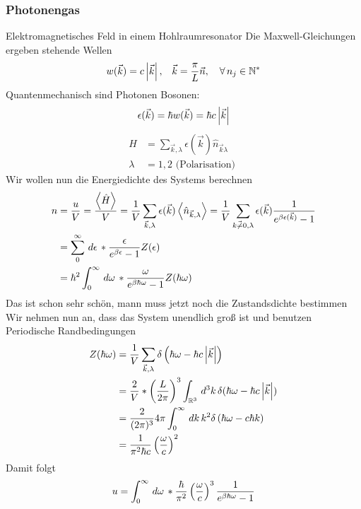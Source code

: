 \subsubsection*{Photonengas}
Elektromagnetisches Feld in einem Hohlraumresonator
Die Maxwell-Gleichungen ergeben stehende Wellen
%
\begin{align*}
  w(\vec{k}) = c \left| \vec{k} \right|, && \vec{k} = \frac{\pi}{L} \vec{n}, \quad\forall\, n_j \in \mathbb{N}^{\ast}
\end{align*}
%
Quantenmechanisch sind Photonen Bosonen:
%
\begin{align*}
  \epsilon(\vec{k}) = \hbar w (\vec{k}) = \hbar c  \left| \vec{k} \right| 
\end{align*}
%
%
\begin{align*}
  H & = \sum_{\vec{k}, \lambda}^{} \epsilon(\vec{k}) \hat{n}_{\vec{k} \lambda} \\
  \lambda & = 1,2 \text{ (Polarisation) }
\end{align*}
%
Wir wollen nun die Energiedichte des Systems berechnen
%
\begin{align*}
  n & = \frac{u}{V}= \frac{\Braket{\hat{H}}}{V} = \frac{1}{V} \sum_{\vec{k}, \lambda}^{} \epsilon(\vec{k})
  \Braket{ \hat{n}_{\vec{k},\lambda} } = \frac{1}{V} \sum_{\vec{k \neq 0 },\lambda}^{} \epsilon(\vec{k}) 
  \frac{1}{e^{\beta \epsilon(\vec{k})} - 1} \\
  & = \sum_{0}^{\infty} \,d\epsilon\, * \frac{\epsilon}{e^{\beta \epsilon} - 1} Z(\epsilon) \\
  & = \hbar^2 \int_{0}^{\infty} \,d\omega\, * \frac{\omega}{e^{\beta \hbar \omega} - 1} Z(\hbar \omega)
\end{align*}
%
Das ist schon sehr schön, mann muss jetzt noch die Zustandsdichte bestimmen
%
Wir nehmen nun an, dass das System unendlich groß ist und benutzen Periodische Randbedingungen
\begin{align*}
  Z(\hbar\omega) & = \frac{1}{V} \sum_{\vec{k}, \lambda}^{} \delta\left( \hbar \omega - \hbar c \left| \vec{k} \right| \right) \\
                 & = \frac{2}{V} * \left( \frac{L}{2\pi} \right)^3 \int_{\mathbb{R}^3}^{} \,d^3 k\, \delta(\hbar \omega - \hbar c \left| \vec{k} \right|) \\
                 & = \frac{2}{(2\pi)^3}  4 \pi \int_{0}^{\infty} \,dk\, k^2 \delta\left( \hbar \omega - c \hbar k \right) \\
                 & = \frac{1}{\pi^2 \hbar c} \left( \frac{\omega}{c} \right)^2
\end{align*}
%
Damit folgt
%
\begin{align*}
  u = \int_{0}^{\infty} \,d\omega\, * \frac{\hbar}{\pi^2} \left( \frac{\omega}{c} \right)^3
  \frac{1}{e^{\beta \hbar \omega} -1 }
\end{align*}
